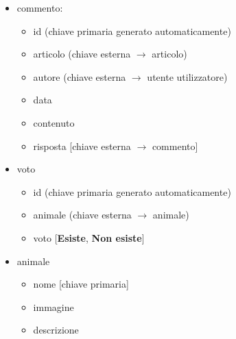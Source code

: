 \begin{itemize}
        \item commento:
        \begin{itemize}
            \item id (chiave primaria generato automaticamente)
            \item articolo (chiave esterna $\rightarrow$ articolo)
            \item autore (chiave esterna $\rightarrow$ utente utilizzatore)
            \item data
            \item contenuto
            \item risposta [chiave esterna $\rightarrow$ commento]
        \end{itemize}

        \item voto
        \begin{itemize}
            \item id (chiave primaria generato automaticamente)
            \item animale (chiave esterna $\rightarrow$ animale)
            \item voto [\textbf{Esiste}, \textbf{Non esiste}]
        \end{itemize}

        \item animale
        \begin{itemize}
            \item nome [chiave primaria]
            \item immagine
            \item descrizione
        \end{itemize}
    \end{itemize}